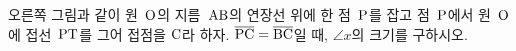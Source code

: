 \noindent\begin{minipage}[t]{0.58\linewidth}\vspace{0pt}\raggedright 오른쪽 그림과 같이 원~$\mathrm{O}$의 지름~$\mathrm{AB}$의 연장선 위에 한 점~$\mathrm{P}$를 잡고 점~$\mathrm{P}$에서 원~$\mathrm{O}$에 접선~$\mathrm{PT}$를 그어 접점을 $\mathrm{C}$라 하자. $\overline{\mathrm{PC}}=\overline{\mathrm{BC}}$일 때, $\angle x$의 크기를 구하시오.\end{minipage}\hfill\begin{minipage}[t]{0.4\linewidth}\vspace{0pt}\centering \resizebox{\ifdim\width>\linewidth\linewidth\else\width\fi}{!}{}\end{minipage}\par

